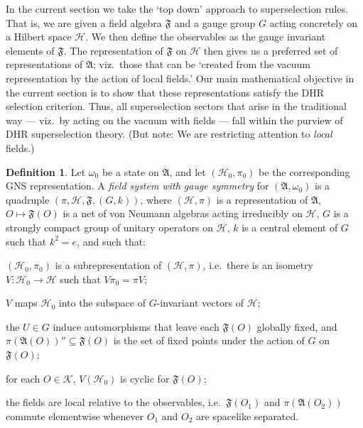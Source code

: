 \documentclass[11pt]{article}
\makeatletter
\newenvironment{bxd}%
  {\bigskip\noindent\begin{Sbox}\begin{minipage}{0.9\textwidth} }%
  {\end{minipage}\end{Sbox}\fbox{\TheSbox}\bigskip}%
\newcommand{\alg}[1]{\mathfrak{#1}}
\theoremstyle{definition}
\theoremstyle{definition}
\newtheorem{defn}[thm]{Definition}
\theoremstyle{remark}
\def\2#1{{\mathcal #1}}
\def\al#1{{\mathfrak #1}}
\def\om{\omega} \def\Om{\Omega} \def\dd{\partial} \def\D{\Delta}
\def\@greek#1{%
 \ifcase#1\or$\alpha$\or$\beta$\or$\gamma$\or$\delta$\or$\varepsilon$%
  \or$\zeta$\or$\eta$\or$\vartheta$\or$\iota$\or$\kappa$\or$\lambda$\or$%
  \mu$\or$\nu$\or$\xi$\or$ o$\or$\varpi$\or$\varrho$\or$\varsigma$\or$\tau$%
  \or$\upsilon$\or$\varphi$\or$\chi$\or$\psi$\or$\omega$\else\@ctrerr\fi}
\def\greek#1{\@greek{\csname c@#1\endcsname}}
\newcounter{bean}
\newcommand{\fields}{(\pi ,\2H ,\alg{F},(G,k))}
\makeatother
\begin{document}
In the current section we take the `top down' approach to
superselection rules.  That is, we are given a field algebra $\al F$
and a gauge group $G$ acting concretely on a Hilbert space $\2H$.  We
then define the observables as the gauge invariant elements of $\al
F$.  The representation of $\al F$ on $\2H$ then gives us a preferred
set of representations of $\al A$; viz.\ those that can be `created
from the vacuum representation by the action of local fields.'  Our
main mathematical objective in the current section is to show that
these representations satisfy the DHR selection criterion.  Thus, all
superselection sectors that arise in the traditional way --- viz.\ by
acting on the vacuum with fields --- fall within the purview of DHR
superselection theory.  (But note: We are restricting attention to
\emph{local} fields.)

\begin{bxd} \begin{defn} \label{field-system} Let $\om _0$ be a state
    on $\al A$, and let $(\2H _0,\pi _0 )$ be the corresponding GNS
    representation.  A \emph{field system with gauge symmetry} for
    $(\al A,\om _0)$ is a quadruple $\fields$, where $(\2H ,\pi )$ is
    a representation of $\al A$, $O\mapsto \al F(O)$ is a net of von
    Neumann algebras acting irreducibly on $\2H$, $G$ is a strongly
    compact group of unitary operators on $\2H$, $k$ is a central
    element of $G$ such that $k^2=e$, and such that:
    \begin{list}%
 {\boldmath{\greek{bean})}}{
 \setlength{\rightmargin}{\leftmargin}%
 \setlength{\itemindent}{-1em}  }
\item $(\2H _0,\pi _0)$ is a subrepresentation of $(\2H ,\pi )$, i.e.\
  there is an isometry $V:\2H _0\to \2H$ such that $V\pi _0=\pi V$; 
\item $V$ maps $\2H _0$ into the subspace of $G$-invariant vectors of
  $\2H$;
\item the $U\in G$ induce automorphisms that leave each
  $\al F(O)$ globally fixed, and $\pi (\al
  A(O))''\subseteq \al F(O)$ is the set of fixed points
  under the action of $G$ on $\al F(O)$;
\item for each $O\in \2K$, $V(\2H _0 )$ is cyclic for $\alg{F}(O)$;
\item the fields are local relative to the observables, i.e.\ $\alg{F}(O_1)$ and $\pi
  (\alg{A}(O_2))$ commute elementwise whenever $O_1$ and $O_2$ are spacelike
  separated. \end{list}

\end{defn}
\end{bxd}
\end{document}
